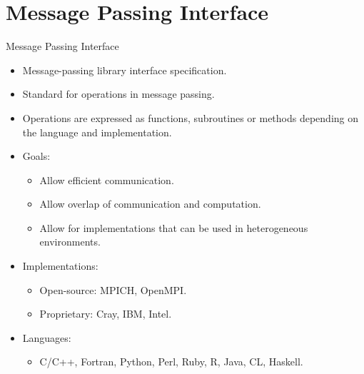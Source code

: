 \section{Message Passing Interface}
\begin{frame}{Message Passing Interface}
    \begin{itemize}
        \item Message-passing library interface specification.
        \vspace{2mm}
        \item Standard for operations in message passing.
        \vspace{2mm}
        \item Operations are expressed as functions, subroutines or methods depending on the language and implementation. 
        \vspace{2mm}
        \item Goals: 
        \begin{itemize}
        \item Allow efficient communication.
        \vspace{1mm}
        \item Allow overlap of communication and computation.
        \vspace{1mm}
        \item Allow for implementations that can be used in heterogeneous environments. 
        \end{itemize}
         \vspace{1mm}
        \item Implementations:
        \begin{itemize}
        \item Open-source: MPICH, OpenMPI.
        \vspace{1mm}
        \item Proprietary: Cray, IBM, Intel.
        \end{itemize}
         \vspace{1mm}
        \item Languages:
        \begin{itemize}
        \item C/C++, Fortran, Python, Perl, Ruby, R, Java, CL, Haskell.
        \end{itemize}
        
    \end{itemize}
\end{frame}

